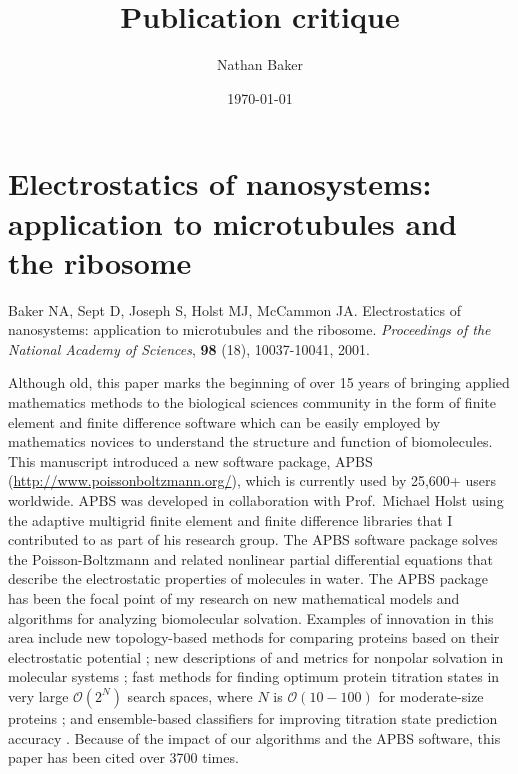 \documentclass[11pt]{amsart}
\begin{document}
	
\title{Publication critique}
\author{Nathan Baker}
\date{\today}

\maketitle

\section{Electrostatics of nanosystems: application to microtubules and the ribosome}

\noindent\makebox[\linewidth]{\rule{\linewidth}{0.4pt}}
Baker NA, Sept D, Joseph S, Holst MJ, McCammon JA.  Electrostatics of nanosystems: application to microtubules and the ribosome. \textit{Proceedings of the National Academy of Sciences}, \textbf{98} (18), 10037-10041, 2001. \\
\noindent\makebox[\linewidth]{\rule{\linewidth}{0.4pt}}

Although old, this paper marks the beginning of over 15 years of bringing applied mathematics methods to the biological sciences community in the form of finite element and finite difference software which can be easily employed by mathematics novices to understand the structure and function of biomolecules.
This manuscript introduced a new software package, APBS (\url{http://www.poissonboltzmann.org/}), which is currently used by 25,600+ users worldwide.
APBS was developed in collaboration with Prof.~Michael Holst using the adaptive multigrid finite element \cite{holst2000adaptive} and finite difference libraries that I contributed to as part of his research group.
The APBS software package solves the Poisson-Boltzmann \cite{ren2012biomolecular} and related nonlinear partial differential equations that describe the electrostatic properties of molecules in water.
The APBS package has been the focal point of my research on new mathematical models and algorithms for analyzing biomolecular solvation.
Examples of innovation in this area include new topology-based methods for comparing proteins based on their electrostatic potential \cite{zhang2006application}; new descriptions of and metrics for nonpolar solvation in molecular systems \cite{wagoner2006assessing}; fast methods for finding optimum protein titration states in very large ${\mathcal{O}}\left(2^N\right)$ search spaces, where $N$ is ${\mathcal{O}}(10-100)$ for moderate-size proteins \cite{hogan2015energy}; and ensemble-based classifiers for improving titration state prediction accuracy \cite{gosink2014bayesian}.
Because of the impact of our algorithms and the APBS software, this paper has been cited over 3700 times.
\end{document}
